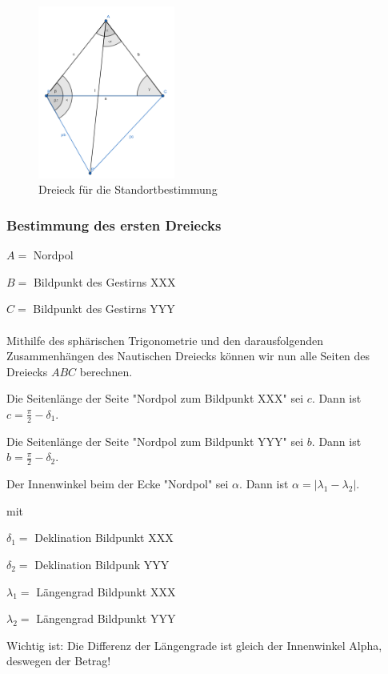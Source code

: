 \begin{figure}[h]
	\begin{center}
		\includegraphics[width=4.5cm]{papers/nav/bilder/dreieck.png}
		\caption[Dreieck für die Standortbestimmung]{Dreieck für die Standortbestimmung}
	\end{center}
\end{figure}


\subsubsection{Bestimmung des ersten Dreiecks}

$A=$ Nordpol

$B=$ Bildpunkt des Gestirns XXX 

$C=$ Bildpunkt des Gestirns YYY
\\
\\
Mithilfe des sphärischen Trigonometrie und den darausfolgenden Zusammenhängen des Nautischen Dreiecks können wir nun alle Seiten des Dreiecks $ABC$ berechnen.

Die Seitenlänge der Seite "Nordpol zum Bildpunkt XXX" sei $c$. 
Dann ist $c = \frac{\pi}{2} - \delta_1$. 

Die Seitenlänge der Seite "Nordpol zum Bildpunkt YYY" sei $b$.
Dann ist $b = \frac{\pi}{2} - \delta_2$. 

Der Innenwinkel beim der Ecke "Nordpol" sei $\alpha$.
Dann ist $ \alpha = |\lambda_1 - \lambda_2|$. 

mit 

$\delta_1 =$ Deklination Bildpunkt XXX

$\delta_2 =$ Deklination Bildpunk YYY 

$\lambda_1 =$ Längengrad Bildpunkt XXX

$\lambda_2 =$ Längengrad Bildpunkt YYY


Wichtig ist: Die Differenz der Längengrade ist gleich der Innenwinkel Alpha, deswegen der Betrag!

